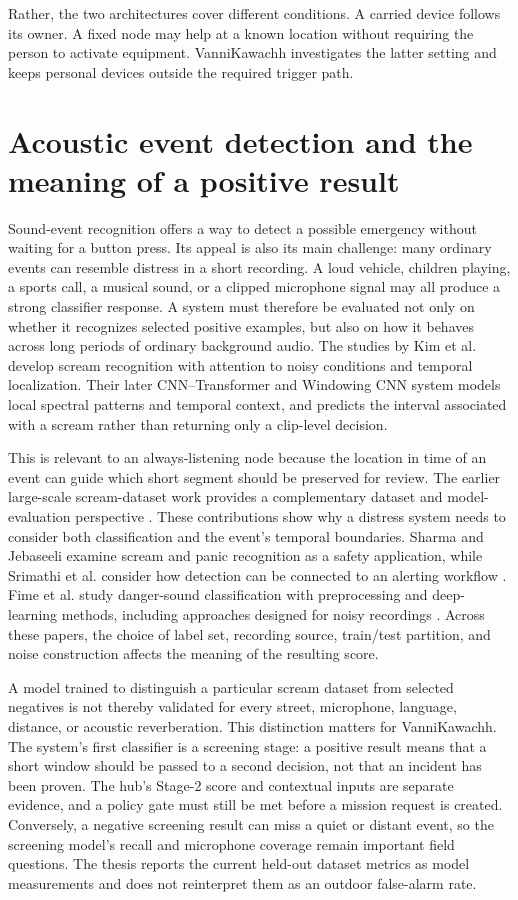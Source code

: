 \documentclass[12pt,a4paper]{report}
\begin{document}
Rather, the two architectures cover different conditions. A carried device follows its owner. A fixed node may help at a known location without requiring the person to activate equipment. VanniKawachh investigates the latter setting and keeps personal devices outside the required trigger path.

\section{Acoustic event detection and the meaning of a positive result}

Sound-event recognition offers a way to detect a possible emergency without waiting for a button press. Its appeal is also its main challenge: many ordinary events can resemble distress in a short recording. A loud vehicle, children playing, a sports call, a musical sound, or a clipped microphone signal may all produce a strong classifier response. A system must therefore be evaluated not only on whether it recognizes selected positive examples, but also on how it behaves across long periods of ordinary background audio. The studies by Kim et al. \cite{kimwindow} develop scream recognition with attention to noisy conditions and temporal localization. Their later CNN–Transformer and Windowing CNN system models local spectral patterns and temporal context, and predicts the interval associated with a scream rather than returning only a clip-level decision.

This is relevant to an always-listening node because the location in time of an event can guide which short segment should be preserved for review. The earlier large-scale scream-dataset work provides a complementary dataset and model-evaluation perspective \cite{kimscream}. These contributions show why a distress system needs to consider both classification and the event's temporal boundaries. Sharma and Jebaseeli examine scream and panic recognition as a safety application, while Srimathi et al. consider how detection can be connected to an alerting workflow \cite{sharma,srimathi}. Fime et al. study danger-sound classification with preprocessing and deep-learning methods, including approaches designed for noisy recordings \cite{fime}. Across these papers, the choice of label set, recording source, train/test partition, and noise construction affects the meaning of the resulting score.

A model trained to distinguish a particular scream dataset from selected negatives is not thereby validated for every street, microphone, language, distance, or acoustic reverberation. This distinction matters for VanniKawachh. The system's first classifier is a screening stage: a positive result means that a short window should be passed to a second decision, not that an incident has been proven. The hub's Stage-2 score and contextual inputs are separate evidence, and a policy gate must still be met before a mission request is created. Conversely, a negative screening result can miss a quiet or distant event, so the screening model's recall and microphone coverage remain important field questions. The thesis reports the current held-out dataset metrics as model measurements and does not reinterpret them as an outdoor false-alarm rate.
\end{document}
